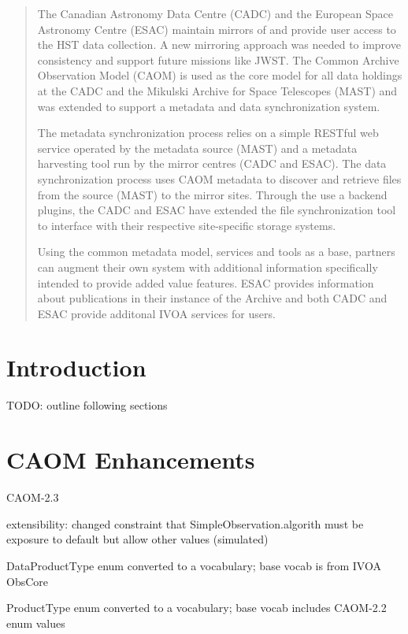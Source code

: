 \documentclass[11pt,twoside]{article}
\begin{document}
\begin{abstract}

The Canadian Astronomy Data Centre (CADC) and the European Space Astronomy Centre (ESAC) maintain mirrors of and provide user access to the HST data collection. A new mirroring approach was needed to improve consistency and support future missions like JWST. The Common Archive Observation Model (CAOM) is used as the core model for all data holdings at the CADC and the Mikulski Archive for Space Telescopes (MAST) and was extended to support a metadata and data synchronization system.

The metadata synchronization process relies on a simple RESTful web service operated by the metadata source (MAST) and a metadata harvesting tool run by the mirror centres (CADC and ESAC). The data synchronization process uses  CAOM metadata to discover and retrieve files from the source (MAST) to the mirror sites.  Through the use a backend plugins, the CADC and ESAC have extended the file synchronization tool to interface with their respective site-specific storage systems.

Using the common metadata model, services and tools as a base, partners can augment their own system with additional information specifically intended to provide added value features. ESAC provides information about publications in their instance of the Archive and both CADC and ESAC provide additonal IVOA services for users.
  
\end{abstract}

\section{Introduction}

TODO: outline following sections

\section{CAOM Enhancements}

CAOM-2.3

extensibility:
changed constraint that SimpleObservation.algorith must be exposure to default but allow other values (simulated)

DataProductType enum converted to a vocabulary; base vocab is from IVOA ObsCore \citep{std:ObsCore}

ProductType enum converted to a vocabulary; base vocab includes CAOM-2.2 enum values
\end{document}
